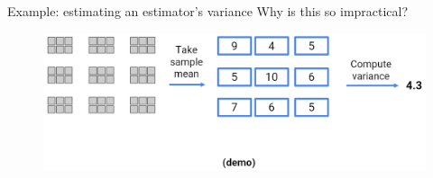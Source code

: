 \documentclass[aspectratio=169]{../latex_main/tntbeamer}  %
\begin{document}
	\begin{frame}{Example: estimating an estimator’s variance}
	    Why is this so impractical?
	    \begin{figure}
	        \centering
	        \includegraphics[scale=.4]{Bild3}
	    \end{figure}
	\end{frame}
\end{document}
